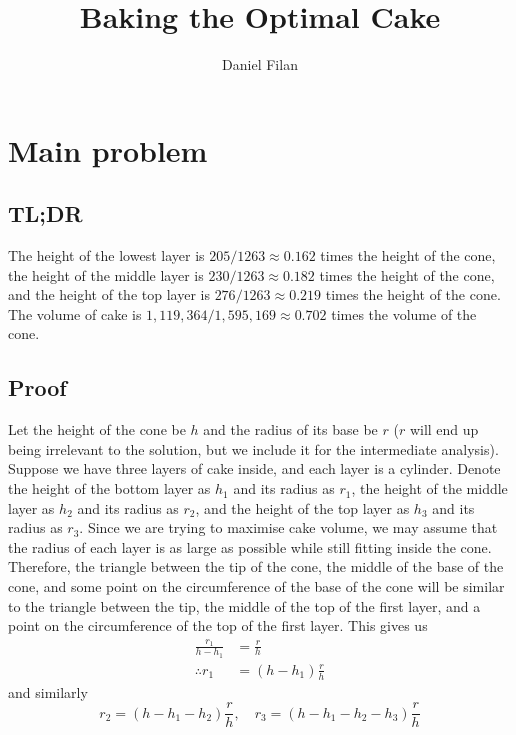 \documentclass[12pt]{article}
\title{Baking the Optimal Cake}
\author{Daniel Filan}
\begin{document}
\maketitle

\section{Main problem}
\label{sec:main-problem}

\subsection{TL;DR}
\label{sec:tl-dr}

The height of the lowest layer is $205/1263 \approx 0.162$ times the height of the cone, the height of the middle layer is $230/1263 \approx 0.182$ times the height of the cone, and the height of the top layer is $276/1263 \approx 0.219$ times the height of the cone. The volume of cake is $1,119,364/1,595,169 \approx 0.702$ times the volume of the cone.

\subsection{Proof}
\label{sec:proof}

Let the height of the cone be $h$ and the radius of its base be $r$ ($r$ will end up being irrelevant to the solution, but we include it for the intermediate analysis). Suppose we have three layers of cake inside, and each layer is a cylinder. Denote the height of the bottom layer as $h_1$ and its radius as $r_1$, the height of the middle layer as $h_2$ and its radius as $r_2$, and the height of the top layer as $h_3$ and its radius as $r_3$. Since we are trying to maximise cake volume, we may assume that the radius of each layer is as large as possible while still fitting inside the cone. Therefore, the triangle between the tip of the cone, the middle of the base of the cone, and some point on the circumference of the base of the cone will be similar to the triangle between the tip, the middle of the top of the first layer, and a point on the circumference of the top of the first layer. This gives us
\begin{align*}
  \frac{r_1}{h-h_1} &= \frac{r}{h} \\
  \therefore r_1 &= (h-h_1) \frac{r}{h}
\end{align*}
and similarly
\begin{equation*}
  r_2 = (h - h_1 - h_2) \frac{r}{h},\quad r_3 = (h - h_1 - h_2 - h_3) \frac{r}{h}
\end{equation*}
\end{document}

